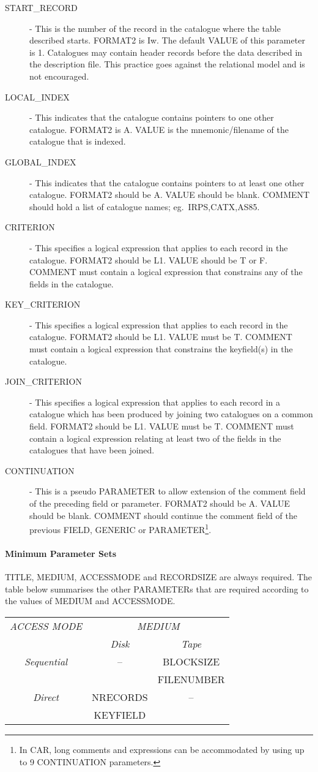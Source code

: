 \begin{description}
\item [START\_RECORD] -
This is the number of the record in the catalogue where the table described
starts.
FORMAT2 is Iw.
The default VALUE of this parameter is 1.
Catalogues may contain header records before the data described in the
description file.
This practice goes against the relational model and is not encouraged.
\item [LOCAL\_INDEX] -
This indicates that the catalogue contains pointers to one other catalogue.
FORMAT2 is A.
VALUE is the mnemonic/filename of the catalogue that is indexed.
\item [GLOBAL\_INDEX] -
This indicates that the catalogue contains pointers to at least one other
catalogue.
FORMAT2 should be A.
VALUE should be blank.
COMMENT should hold a list of catalogue names; eg.\ IRPS,CATX,AS85.
\item [CRITERION] -
This specifies a logical expression that applies to each record in the
catalogue.
FORMAT2 should be L1.
VALUE should be T or F.
COMMENT must contain a logical expression that constrains any of the fields in
the catalogue.
\item [KEY\_CRITERION] -
This specifies a logical expression that applies to each record in the
catalogue.
FORMAT2 should be L1.
VALUE must be T.
COMMENT must contain a logical expression that constrains the keyfield(s) in the
catalogue.
\item [JOIN\_CRITERION] -
This specifies a logical expression that applies to each record in a catalogue
which has been produced by joining two catalogues on a common field.
FORMAT2 should be L1.
VALUE must be T.
COMMENT must contain a logical expression relating at least two of the fields in
the catalogues that have been joined.
\item [CONTINUATION] -
This is a pseudo PARAMETER to allow extension of the comment field of the
preceding field or parameter.
FORMAT2 should be A.
VALUE should be blank.
COMMENT should continue the comment field of the previous FIELD, GENERIC or
PARAMETER\footnote
{In CAR, long comments and expressions can be accommodated by using up to 9
CONTINUATION parameters.}.
\end{description}
\paragraph {Minimum Parameter Sets}
TITLE, MEDIUM, ACCESSMODE and RECORDSIZE are always required.
The table below summarises the other PARAMETERs that are required according to
the values of MEDIUM and ACCESSMODE.
\begin{center}
\begin{tabular}{||c|c|c||} \hline
{\em ACCESS MODE} & \multicolumn{2}{c||}{{\em MEDIUM}} \\ \cline{2-3}
& {\em Disk} & {\em Tape} \\ \hline
{\em Sequential} & -- & BLOCKSIZE \\
& & FILENUMBER \\ \hline
{\em Direct} & NRECORDS & -- \\
& KEYFIELD & \\ \hline
\end{tabular}
\end{center}
